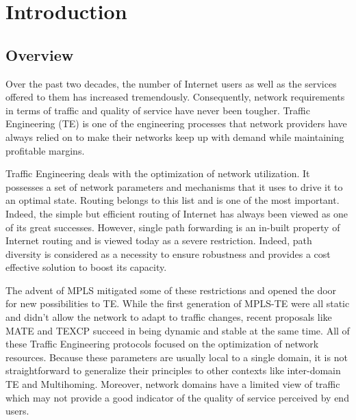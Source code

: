 \chapter{Introduction}
\label{chapter:intro}

\section{Overview} %
Over the past two decades, the number of Internet users as well as the services offered to them has increased tremendously. Consequently, network requirements in terms of traffic and quality of service have never been tougher.  Traffic Engineering (TE) is one of the engineering processes that network providers have always relied on to make their networks keep up with demand while maintaining profitable margins. 

Traffic Engineering deals with the optimization of network utilization. It possesses a set of network parameters and mechanisms that it uses to drive it to an optimal state. Routing belongs to this list and is one of the most important. Indeed, the simple but efficient routing of Internet has always been viewed as one of its great successes. However, single path forwarding is an in-built property of Internet routing and is viewed today as a severe restriction. Indeed, path diversity is considered as a necessity to ensure robustness and provides a cost effective solution to boost its capacity.

The advent of MPLS \cite{} mitigated some of these restrictions and opened the door for new possibilities to TE. While the first generation of MPLS-TE \cite{} were all static and didn't allow the network to adapt to traffic changes, recent proposals like MATE \cite{} and TEXCP \cite{} succeed in being dynamic and stable at the same time. All of these Traffic Engineering protocols focused on the optimization of network resources. Because these parameters are usually local to a single domain, it is not straightforward to generalize their principles to other contexts like inter-domain TE and Multihoming. Moreover, network domains have a limited view of traffic which may not provide a good indicator of the quality of service perceived by end users.

